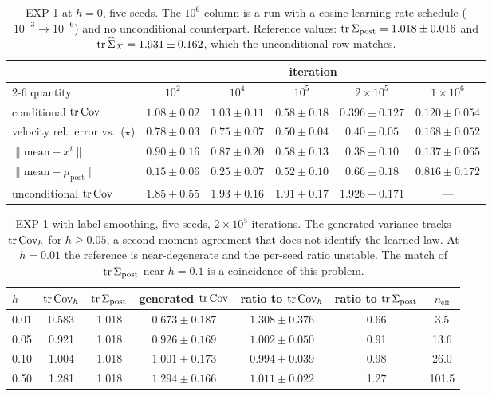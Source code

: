 \documentclass{article} %
\newif\ificlr
\theoremstyle{plain}
\theoremstyle{definition}
\theoremstyle{remark}
\begin{document}
\begin{table}[htb]
\centering\small
\ificlr\setlength{\tabcolsep}{4.5pt}\fi
\begin{tabular}{lccccc}
\toprule
& \multicolumn{5}{c}{iteration}\\
\cmidrule(l){2-6}
quantity & $10^2$ & $10^4$ & $10^5$ & $2\times10^5$ & $1\times10^6$ \\
\midrule
conditional $\operatorname{tr}\operatorname{Cov}$ & $1.08\pm0.02$ & $1.03\pm0.11$ & $0.58\pm0.18$ & $0.396\pm0.127$ & $0.120\pm0.054$\\
velocity rel.\ error vs.\ ($\star$) & $0.78\pm0.03$ & $0.75\pm0.07$ & $0.50\pm0.04$ & $0.40\pm0.05$ & $0.168\pm0.052$\\
$\|\text{mean}-x^i\|$ & $0.90\pm0.16$ & $0.87\pm0.20$ & $0.58\pm0.13$ & $0.38\pm0.10$ & $0.137\pm0.065$\\
$\|\text{mean}-\mu_{\mathrm{post}}\|$ & $0.15\pm0.06$ & $0.25\pm0.07$ & $0.52\pm0.10$ & $0.66\pm0.18$ & $0.816\pm0.172$\\
unconditional $\operatorname{tr}\operatorname{Cov}$ & $1.85\pm0.55$ & $1.93\pm0.16$ & $1.91\pm0.17$ & $1.926\pm0.171$ & ---\\
\bottomrule
\end{tabular}
\caption{EXP-1 at $h=0$, five seeds. The $10^6$ column is a run with a cosine learning-rate
schedule ($10^{-3}\to10^{-6}$) and no unconditional counterpart. Reference values:
$\operatorname{tr}\Sigma_{\mathrm{post}}=1.018\pm0.016$ and $\operatorname{tr}\widehat{\Sigma}_X=1.931\pm0.162$, which the unconditional row matches.}
\label{tab:exp1}
\end{table}

\begin{table}[htb]
\centering\small
\begin{tabular}{lcccccc}
\toprule
$h$ & $\operatorname{tr}\operatorname{Cov}_h$ & $\operatorname{tr}\Sigma_{\mathrm{post}}$ & generated $\operatorname{tr}\operatorname{Cov}$ & ratio to $\operatorname{tr}\operatorname{Cov}_h$ & ratio to $\operatorname{tr}\Sigma_{\mathrm{post}}$ & $n_{\mathrm{eff}}$\\
\midrule
0.01 & 0.583 & 1.018 & $0.673\pm0.187$ & $1.308\pm0.376$ & 0.66 & 3.5\\
0.05 & 0.921 & 1.018 & $0.926\pm0.169$ & $1.002\pm0.050$ & 0.91 & 13.6\\
0.10 & 1.004 & 1.018 & $1.001\pm0.173$ & $0.994\pm0.039$ & 0.98 & 26.0\\
0.50 & 1.281 & 1.018 & $1.294\pm0.166$ & $1.011\pm0.022$ & 1.27 & 101.5\\
\bottomrule
\end{tabular}
\caption{EXP-1 with label smoothing, five seeds, $2\times10^5$ iterations. The generated variance
tracks $\operatorname{tr}\operatorname{Cov}_h$ for $h\ge0.05$, a second-moment agreement that does not identify the learned
law. At $h=0.01$ the reference is near-degenerate and the per-seed ratio unstable. The match of
$\operatorname{tr}\Sigma_{\mathrm{post}}$ near $h=0.1$ is a coincidence of this problem.}
\label{tab:p7kernel}
\end{table}
\end{document}
